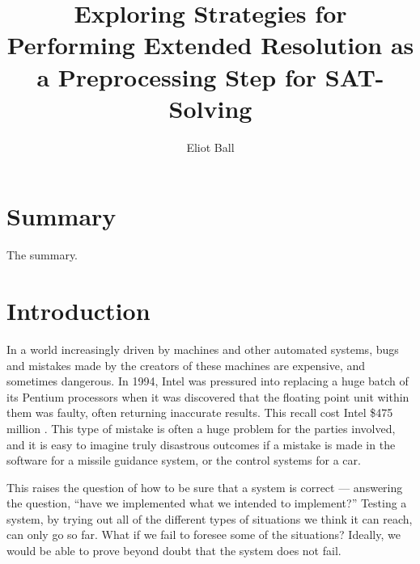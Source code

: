 \documentclass[proof,pdftex,11pt,a4]{article}
\begin{document}
\title{\textbf{Exploring Strategies for Performing Extended Resolution as a Preprocessing Step for SAT-Solving}}
\author{Eliot Ball}

\maketitle

\section*{Summary}

The summary.

\tableofcontents

\section{Introduction}

In a world increasingly driven by machines and other automated systems, bugs and mistakes made by the creators of these machines are expensive, and sometimes dangerous. In 1994, Intel was pressured into replacing a huge batch of its Pentium processors when it was discovered that the floating point unit within them was faulty, often returning inaccurate results. This recall cost Intel \$475 million \cite{Nicely:2008}. This type of mistake is often a huge problem for the parties involved, and it is easy to imagine truly disastrous outcomes if a mistake is made in the software for a missile guidance system, or the control systems for a car.

This raises the question of how to be sure that a system is correct --- answering the question, ``have we implemented what we intended to implement?'' Testing a system, by trying out all of the different types of situations we think it can reach, can only go so far. What if we fail to foresee some of the situations? Ideally, we would be able to prove beyond doubt that the system does not fail.
\end{document}
